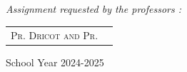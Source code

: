 \documentclass[11pt,a4paper]{report}
\begin{document}
\begin{titlepage}
\begin{minipage}{0.4\textwidth}
  \begin{flushright} \large
    \begin{flushleft} \large
    \emph{} \\
        

    \end{flushleft}

  \end{flushright}
\end{minipage}\\[1cm]

{\large \textit{Assignment requested by the professors  : }}\\[0.5cm]

\centering
\begin{tabular}{ll}
\large \textsc{Pr. Dricot and Pr.  }
\end{tabular}

\vspace{20mm}

{\large School Year 2024-2025}

\end{titlepage}
\end{document}
